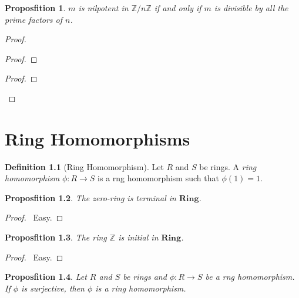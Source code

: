\documentclass{book}
\let\qed\relax
\newtheorem{prop}{Proposfition}[chapter]
\theoremstyle{definition}
\newtheorem{df}[prop]{Definition}
\renewcommand{\mod}{\ensuremath{\operatorname{mod}}}
\begin{document}
\begin{prop}
$m$ is nilpotent in $\mathbb{Z} / n \mathbb{Z}$ if and only if $m$ is divisible by all the prime factors of $n$.
\end{prop}

\begin{proof}
\pf
{}
\begin{proof}
	\step{a}{\assume{$m^a \equiv 0 (\mod n)$}}
\end{proof}
\begin{proof}
	\step{e}{$m^a \equiv 0 (\mod n)$}
\end{proof}
\qed
\end{proof}

\chapter{Ring Homomorphisms}

\begin{df}[Ring Homomorphism]
Let $R$ and $S$ be rings. A \emph{ring homomorphism} $\phi : R \rightarrow S$ is a rng homomorphism such that $\phi(1) = 1$.
\end{df}

\begin{prop}
The zero-ring is terminal in $\mathbf{Ring}$.
\end{prop}

\begin{proof}
\pf\ Easy. \qed
\end{proof}

\begin{prop}
The ring $\mathbb{Z}$ is initial in $\mathbf{Ring}$.
\end{prop}

\begin{proof}
\pf\ Easy. \qed
\end{proof}

\begin{prop}
Let $R$ and $S$ be rings and $\phi : R \rightarrow S$ be a rng homomorphism. If $\phi$ is surjective, then $\phi$ is a ring homomorphism.
\end{prop}
\end{document}

